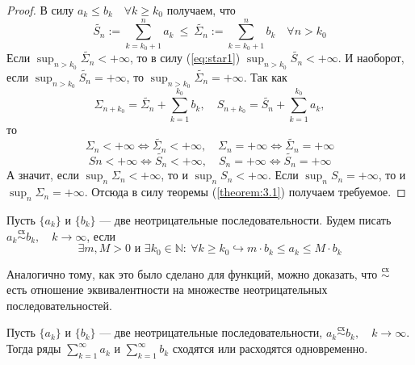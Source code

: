 \documentclass[11pt]{article}
\begin{document}
\begin{proof}
    В силу $a_k \leq b_k \quad \forall k \geq k_0$ получаем, что \[\widetilde{S_n} :=
    \sum_{k = k_0 + 1}^{n} a_k \ \leq \ \widetilde{\Sigma_n} := \sum_{k = k_0 + 1}^n b_k \quad 
    \forall n > k_0 \label{eq:star1} \tag{*}\]
    Если $\displaystyle \sup_{n > k_0} \widetilde{\Sigma_n} < +\infty$, то в силу (\ref{eq:star1})
    $\displaystyle \sup_{n > k_0} \widetilde{S_n} < +\infty$. И наоборот, если 
    $\displaystyle \sup_{n > k_0} \widetilde{S_n} = +\infty$, то $\displaystyle \sup_{n > k_0} 
    \widetilde{\Sigma_n} = +\infty$. Так как \[\Sigma_{n + k_0} = \widetilde{\Sigma_n} + \sum_{k = 1}^{k_0} b_k,
    \quad S_{n + k_0} = \widetilde{S_n} + \sum_{k = 1}^{k_0} a_k,\] то \[\Sigma_{n} < +\infty \Longleftrightarrow
    \widetilde{\Sigma_n} < +\infty, \quad \Sigma_{n} = +\infty \Longleftrightarrow \widetilde{\Sigma_n} = +\infty\]
    \[S{n} < +\infty \Longleftrightarrow \widetilde{S_n} < +\infty, \quad S_{n} = +\infty \Longleftrightarrow \widetilde{S_n} = +\infty\]
    А значит, если $\displaystyle \sup_{n} \Sigma_n < +\infty$, то и $\displaystyle \sup_{n} S_n < +\infty$. Если 
    $\displaystyle \sup_{n} S_n = +\infty$, то и $\displaystyle \sup_{n} \Sigma_n = +\infty$. Отсюда в силу теоремы 
    (\ref{theorem:3.1}) получаем требуемое.
\end{proof}

\begin{definition}
    Пусть $\{a_k\}$ и $\{b_k\}$ --- две неотрицательные последовательности. Будем писать $\displaystyle a_k 
    \overset{\text{сх}}{\sim} b_k, \quad k \to \infty$, если \[\exists m, M > 0 \text{ и } \exists k_0 \in  
    \mathbb{N}: \ \forall k \geq k_0 \hookrightarrow m \cdot b_k \leq a_k \leq M \cdot b_k\]
\end{definition}

\begin{remark}
    Аналогично тому, как это было сделано для функций, можно доказать, что $\overset{\text{сх}}{\sim}$
    есть отношение эквивалентности на множестве неотрицательных последовательностей.
\end{remark}

\begin{theorem}
    Пусть $\{a_k\}$ и $\{b_k\}$ --- две неотрицательные последовательности, $\displaystyle a_k 
    \overset{\text{сх}}{\sim} b_k, \quad k \to \infty$. Тогда ряды $\displaystyle \sum_{k = 1}^{\infty} a_k$ и 
    $\displaystyle \sum_{k = 1}^{\infty} b_k$ сходятся или расходятся одновременно.
\end{theorem}
\end{document}
